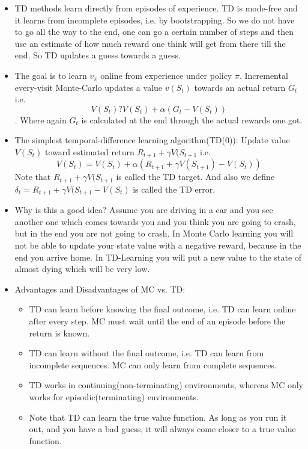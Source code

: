 \documentclass[a4paper]{article}
\begin{document}
\begin{itemize}
    \item TD methods learn directly from episodes of experience. TD is mode-free and it learns from incomplete episodes, i.e. by bootstrapping. So we do not have to go all the way to the end, one can go a certain number of steps and then use an estimate of how much reward one think will get from there till the end. So TD updates a guess towards a guess. 
    \item The goal is to learn $v_{\pi}$ online from experience under policy $\pi$. Incremental every-visit Monte-Carlo updates a value $v(S_t)$ towards an actual return $G_t$ i.e. $$V(S_t) ? V(S_t) + \alpha (G_t - V(S_t))$$. Where again $G_t$ is calculated at the end through the actual rewards one got. 
    \item The simplest temporal-difference learning algorithm(TD(0)):\newline
    Update value $V(S_t)$ toward estimated return $R_{t+1} + \gamma V(S_{t+1}$ i.e. $$V(S_t) = V(S_t) + \alpha(R_{t+1} + \gamma V(S_{t+1}) - V(S_t))$$
    \newline Note that $R_{t+1} + \gamma V(S_{t+1}$ is called the TD target. And also we define $\delta_t = R_{t+1} + \gamma V(S_{t+1} - V(S_t)$ is called the TD error. 
    \item  Why is this a good idea? Assume you are driving in a car and you see another one which comes towards you and you think you are going to crash, but in the end you are not going to crash. In Monte Carlo learning you will not be able to update your state value with a negative reward, because in the end you arrive home. In TD-Learning you will put a new value to the state of almost dying which will be very low. 
    \item Advantages and Disadvantages of MC vs. TD: 
        \begin{itemize}
            \item TD can learn before knowing the final outcome, i.e. TD can learn online after every step. MC must wait until the end of an episode before the return is known. 
            \item TD can learn without the final outcome, i.e. TD can learn from incomplete sequences. MC can only learn from complete sequences. 
            \item TD works in continuing(non-terminating) environments, whereas MC only works for episodic(terminating) environments. 
            \item Note that TD can learn the true value function. As long as you run it out, and you have a bad guess, it will always come closer to a true value function. 

\end{itemize}
\end{itemize}
\end{document}
